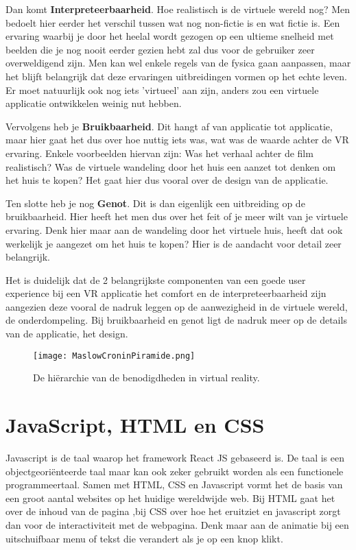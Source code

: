 Dan komt \textbf{Interpreteerbaarheid}. Hoe realistisch is de virtuele wereld nog? Men bedoelt hier eerder het verschil tussen wat nog non-fictie is en wat fictie is. Een ervaring waarbij je door het heelal wordt gezogen op een ultieme snelheid met beelden die je nog nooit eerder gezien hebt zal dus voor de gebruiker zeer overweldigend zijn. Men kan wel enkele regels van de fysica gaan aanpassen, maar het blijft belangrijk dat deze ervaringen uitbreidingen vormen op het echte leven. Er moet natuurlijk ook nog iets 'virtueel' aan zijn, anders zou een virtuele applicatie ontwikkelen weinig nut hebben.

Vervolgens heb je \textbf{Bruikbaarheid}. Dit hangt af van applicatie tot applicatie, maar hier gaat het dus over hoe nuttig iets was, wat was de waarde achter de VR ervaring. Enkele voorbeelden hiervan zijn: Was het verhaal achter de film realistisch? Was de virtuele wandeling door het huis een aanzet tot denken om het huis te kopen? Het gaat hier dus vooral over de design van de applicatie.

Ten slotte heb je nog \textbf{Genot}. Dit is dan eigenlijk een uitbreiding op de bruikbaarheid. Hier heeft het men dus over het feit of je meer wilt van je virtuele ervaring. Denk hier maar aan de wandeling door het virtuele huis, heeft dat ook werkelijk je aangezet om het huis te kopen? Hier is de aandacht voor detail zeer belangrijk.

Het is duidelijk dat de 2 belangrijkste componenten van een goede user experience bij een VR applicatie het comfort en de interpreteerbaarheid zijn aangezien deze vooral de nadruk leggen op de aanwezigheid in de virtuele wereld, de onderdompeling. Bij bruikbaarheid en genot ligt de nadruk meer op de details van de applicatie, het design.

\begin{figure}
	\centering
	\texttt{[image: MaslowCroninPiramide.png]}
	\caption{De hiërarchie van de benodigdheden in virtual reality.}
	\label{fig:maslowcroninpiramide}
\end{figure}

\section{JavaScript, HTML en CSS}
\label{sec:frameworks}
Javascript is de taal waarop het framework React JS gebaseerd is. De taal is een objectgeoriënteerde taal maar kan ook zeker gebruikt worden als een functionele programmeertaal. Samen met HTML, CSS en Javascript vormt het de basis van een groot aantal websites op het huidige wereldwijde web. Bij HTML gaat het over de inhoud van de pagina ,bij CSS over hoe het eruitziet en javascript zorgt dan voor de interactiviteit met de webpagina. Denk maar aan de animatie bij een uitschuifbaar menu of tekst die verandert als je op een knop klikt.

